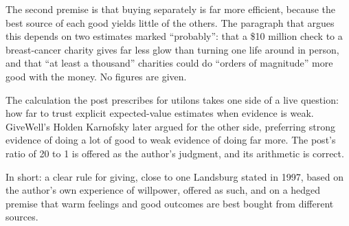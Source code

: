 \begin{afterword}
The second premise is that buying separately is far more efficient, because the best source of each good yields little of the others. The paragraph that argues this depends on two estimates marked ``probably'': that a \$10 million check to a breast-cancer charity gives far less glow than turning one life around in person, and that ``at least a thousand'' charities could do ``orders of magnitude'' more good with the money. No figures are given.

The calculation the post prescribes for utilons takes one side of a live question: how far to trust explicit expected-value estimates when evidence is weak. GiveWell's Holden Karnofsky later argued for the other side, preferring strong evidence of doing a lot of good to weak evidence of doing far more. The post's ratio of 20 to 1 is offered as the author's judgment, and its arithmetic is correct.

In short: a clear rule for giving, close to one Landsburg stated in 1997, based on the author's own experience of willpower, offered as such, and on a hedged premise that warm feelings and good outcomes are best bought from different sources.
\end{afterword}

